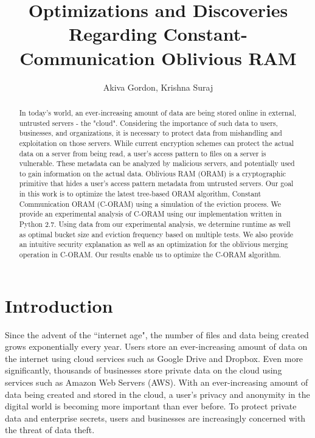 \documentclass[12pt, oneside]{article}   	%
\title{Optimizations and Discoveries Regarding Constant-Communication Oblivious RAM}
\author{Akiva Gordon, Krishna Suraj}
\date{}							%
\begin{document}
\maketitle

\begin{abstract}
In today's world, an ever-increasing amount of data are being stored online in external, untrusted servers - the "cloud". Considering the importance of such data to users, businesses, and organizations, it is necessary to protect data from mishandling and exploitation on those servers. While current encryption schemes can protect the actual data on a server from being read, a user's access pattern to files on a server is vulnerable. These metadata can be analyzed by malicious servers, and potentially used to gain information on the actual data. Oblivious RAM (ORAM) is a cryptographic primitive that hides a user's access pattern metadata from untrusted servers. Our goal in this work is to optimize the latest tree-based ORAM algorithm, Constant Communication ORAM (C-ORAM) using a simulation of the eviction process. We provide an experimental analysis of C-ORAM using our implementation written in Python 2.7. Using data from our experimental analysis, we determine runtime as well as optimal bucket size and eviction frequency based on multiple tests. We also provide an intuitive security explanation as well as an optimization for the oblivious merging operation in C-ORAM. Our results enable us to optimize the C-ORAM algorithm. 

\end{abstract}


\section{Introduction}
Since the advent of the ``internet age", the number of files and data being created grows exponentially every year. Users store an ever-increasing amount of data on the internet using cloud services such as Google Drive and Dropbox. Even more significantly, thousands of businesses store private data on the cloud using services such as Amazon Web Servers (AWS). With an ever-increasing amount of data being created and stored in the cloud, a user's privacy and anonymity in the digital world is becoming more important than ever before. To protect private data and enterprise secrets, users and businesses are increasingly concerned with the threat of data theft.
\end{document}
